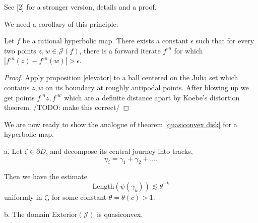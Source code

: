 See {[}2{]} for a stronger version, details and a proof.

We need a corollary of this principle:

\begin{corollary}
	Let $f$ be a rational hyperbolic map. There exists a constant $\epsilon$ such that for every two points $z,w\in\mathcal{J}(f)$, there is a forward iterate
$f^{\circ n}$ for which $\left|f^{\circ n}(z)-f^{\circ n}(w)\right|>\epsilon$.	
\end{corollary}

\begin{proof}
	Apply proposition \ref{elevator} to a ball centered on the Julia set which contains $z,w$ on its boundary at roughly antipodal points. After blowing up we get points $f^{\circ n}z,f^{\circ w}$ which are a definite distance apart by Koebe's distortion theorem. /TODO: make this correct/
\end{proof}

We are now ready to show the analogue of theorem \ref{quasiconvex disk} for a hyperbolic map. 
\begin{theorem} 
a. Let $\zeta\in\partial{D}$, and decompose its central journey into tracks, 
$$\eta_\zeta = \gamma _1 +\gamma_2 +\ldots.$$

Then we have the estimate
$$\mathrm{Length}(\psi(\gamma_{k}))\lesssim\theta^{-k}$$ uniformly in
$\zeta$, for some constant $\theta=\theta(c)>1$.

b. The domain $\mathrm{Exterior}(\mathcal{J})$ is quasiconvex.
\end{theorem}

